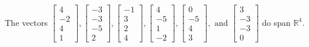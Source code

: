 \begin{exercise}
\begin{exerciseStatement}
  \end{exerciseStatement}
  \begin{exerciseAnswer}
   The vectors \(\left[\begin{array}{r}
4 \\
-2 \\
4 \\
1
\end{array}\right] , \left[\begin{array}{r}
-3 \\
-3 \\
-5 \\
2
\end{array}\right] , \left[\begin{array}{r}
-1 \\
3 \\
2 \\
4
\end{array}\right] , \left[\begin{array}{r}
4 \\
-5 \\
1 \\
-2
\end{array}\right] , \left[\begin{array}{r}
0 \\
-5 \\
4 \\
3
\end{array}\right] , \text{ and } \left[\begin{array}{r}
3 \\
-3 \\
-3 \\
0
\end{array}\right]\) 
  	 do  
	span \(\mathbb{R}^4\).
  


  \end{exerciseAnswer}
\end{exercise}